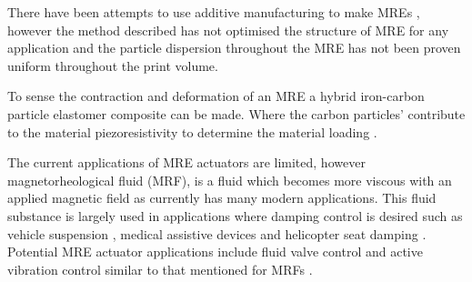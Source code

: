 There have been attempts to use additive manufacturing to make MREs \citep{Krueger2014,Ge2020}, however the method described has not optimised the structure of MRE for any application and the particle dispersion throughout the MRE has not been proven uniform throughout the print volume. 

To sense the contraction and deformation of an MRE a hybrid iron-carbon particle elastomer composite can be made. Where the carbon particles' contribute to the material piezoresistivity to determine the material loading \cite{Bica2011,Costi2024}. 

The current applications of MRE actuators are limited, however magnetorheological fluid (MRF), is a fluid which becomes more viscous with an applied magnetic field as currently has many modern applications. This fluid substance is largely used in applications where damping control is desired such as vehicle suspension \citep{UnuhH2019}, medical assistive devices \citep{Chen2017} and helicopter seat damping \citep{Hiemenz2007}. Potential MRE actuator applications include fluid valve control \citep{Bose2012} and active vibration control similar to that mentioned for MRFs \citep{UnuhH2019}. 


